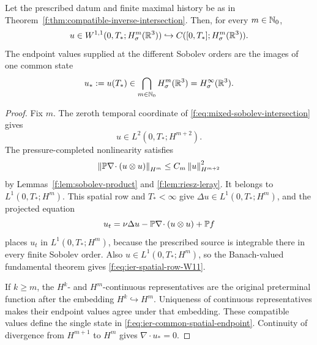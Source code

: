 \begin{proposition}
\label{f:prop:ier-complete-spatial-endpoint}
Let the prescribed datum and finite maximal history be as in
Theorem~\ref{f:thm:compatible-inverse-intersection}.  Then, for every
\(m\in\mathbb N_0\),
\begin{equation}
 u\in W^{1,1}(0,T_*;H^m_\sigma(\mathbb R^3))
 \hookrightarrow C([0,T_*];H^m_\sigma(\mathbb R^3)).
 \label{f:eq:ier-spatial-row-W11}
\end{equation}
The endpoint values supplied at the different Sobolev orders are the images
of one common state
\begin{equation}
 u_*:=u(T_*)\in\bigcap_{m\in\mathbb N_0}H^m_\sigma(\mathbb R^3)
 =H^\infty_\sigma(\mathbb R^3).
 \label{f:eq:ier-common-spatial-endpoint}
\end{equation}
\end{proposition}

\begin{proof}
Fix \(m\).  The zeroth temporal coordinate of
\eqref{f:eq:mixed-sobolev-intersection} gives
\[
 u\in L^2(0,T_*;H^{m+2}).
\]
The pressure-completed nonlinearity satisfies
\[
 \left\lVert \mathbb P\nabla\!\cdot(u\otimes u)\right\rVert_{H^m}
 \le C_m\left\lVert u\right\rVert_{H^{m+2}}^2
\]
by Lemmas~\ref{f:lem:sobolev-product} and \ref{f:lem:riesz-leray}.  It belongs
to \(L^1(0,T_*;H^m)\).  This spatial row and \(T_*<\infty\) give
 \(\Delta u\in L^1(0,T_*;H^m)\), and the projected equation
\[
 u_t=\nu\Delta u-\mathbb P\nabla\!\cdot(u\otimes u)+\mathbb P f
\]
places \(u_t\) in \(L^1(0,T_*;H^m)\), because the prescribed source is
integrable there in every finite Sobolev order.  Also
\(u\in L^1(0,T_*;H^m)\), so the Banach-valued fundamental theorem gives
\eqref{f:eq:ier-spatial-row-W11}.

If \(k\ge m\), the \(H^k\)- and \(H^m\)-continuous representatives are
the original preterminal function after the embedding \(H^k\hookrightarrow
H^m\).  Uniqueness of continuous representatives makes their endpoint
values agree under that embedding.  These compatible values define the
single state in \eqref{f:eq:ier-common-spatial-endpoint}.  Continuity of
divergence from \(H^{m+1}\) to \(H^m\) gives \(\nabla\cdot u_*=0\).
\end{proof}

